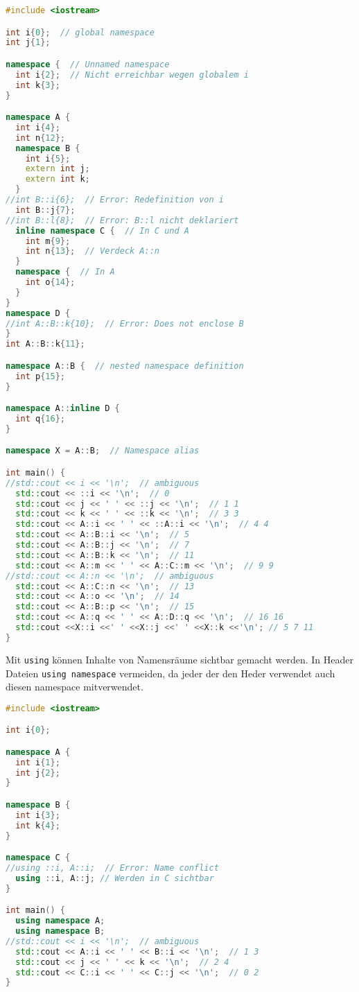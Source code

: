 \begin{lstlisting}[language=C++]
#include <iostream>

int i{0};  // global namespace
int j{1};

namespace {  // Unnamed namespace
  int i{2};  // Nicht erreichbar wegen globalem i
  int k{3};
}

namespace A {
  int i{4};
  int n{12};
  namespace B {
    int i{5};
    extern int j;
    extern int k;
  }
//int B::i{6};  // Error: Redefinition von i
  int B::j{7};
//int B::l{8};  // Error: B::l nicht deklariert
  inline namespace C {  // In C und A
    int m{9};
    int n{13};  // Verdeck A::n
  }
  namespace {  // In A
    int o{14};
  }
}
namespace D {
//int A::B::k{10};  // Error: Does not enclose B
}
int A::B::k{11};

namespace A::B {  // nested namespace definition
  int p{15};
}

namespace A::inline D {
  int q{16};
}

namespace X = A::B;  // Namespace alias

int main() {
//std::cout << i << '\n';  // ambiguous
  std::cout << ::i << '\n';  // 0
  std::cout << j << ' ' << ::j << '\n';  // 1 1
  std::cout << k << ' ' << ::k << '\n';  // 3 3
  std::cout << A::i << ' ' << ::A::i << '\n';  // 4 4
  std::cout << A::B::i << '\n';  // 5
  std::cout << A::B::j << '\n';  // 7
  std::cout << A::B::k << '\n';  // 11
  std::cout << A::m << ' ' << A::C::m << '\n';  // 9 9
//std::cout << A::n << '\n';  // ambiguous
  std::cout << A::C::n << '\n';  // 13
  std::cout << A::o << '\n';  // 14
  std::cout << A::B::p << '\n';  // 15
  std::cout << A::q << ' ' << A::D::q << '\n';  // 16 16
  std::cout <<X::i <<' ' <<X::j <<' ' <<X::k <<'\n'; // 5 7 11
}
\end{lstlisting}

Mit \lstinline|using| können Inhalte von Namensräume sichtbar gemacht werden. In
Header Dateien \lstinline|using namespace| vermeiden, da jeder der den Heder
verwendet auch diesen namespace mitverwendet.

\begin{lstlisting}[language=C++]
#include <iostream>

int i{0};

namespace A {
  int i{1};
  int j{2};
}

namespace B {
  int i{3};
  int k{4};
}

namespace C {
//using ::i, A::i;  // Error: Name conflict
  using ::i, A::j; // Werden in C sichtbar
}

int main() {
  using namespace A;
  using namespace B;
//std::cout << i << '\n';  // ambiguous
  std::cout << A::i << ' ' << B::i << '\n';  // 1 3
  std::cout << j << ' ' << k << '\n';  // 2 4
  std::cout << C::i << ' ' << C::j << '\n';  // 0 2
}
\end{lstlisting}


